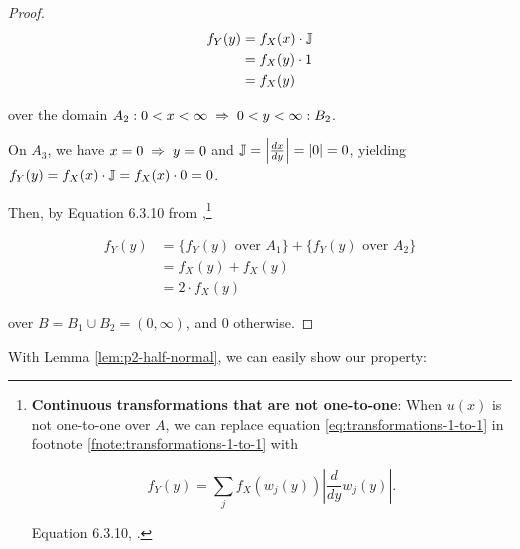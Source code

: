 \documentclass{article}
\begin{document}
\begin{proof}
  \begin{align*}
    f_Y(y) &= f_X(x) \cdot \mathbb{J} \\
    &= f_X(y) \cdot 1 \\
    &= f_X(y)
  \end{align*}

  over the domain $A_2: 0 < x < \infty \;\Rightarrow\; 0 < y < \infty :B_2$.

  On $A_3$, we have $x = 0 \;\Rightarrow\; y = 0$ and $\mathbb{J} = \left| \frac{dx}{dy} \right| =
  |0| = 0$, yielding $f_Y(y) = f_X(x) \cdot \mathbb{J} = f_X(x) \cdot 0 = 0$.

  Then, by Equation 6.3.10 from \citet{textbook},\footnote{\textbf{Continuous
  transformations that are not one-to-one}: When $u(x)$ is not one-to-one over
  $A$, we can replace equation \eqref{eq:transformations-1-to-1} in footnote
  \ref{fnote:transformations-1-to-1} with 

  \begin{equation*}
    f_Y(y) = \sum_j f_X(w_j(y)) \left| \frac{d}{dy} w_j(y) \right|.
  \end{equation*}

  Equation 6.3.10, \citet{textbook}.
  }

  \begin{align*}
    f_Y(y) &= \{ f_Y(y) \textrm{ over } A_1 \} + \{ f_Y(y) \textrm{ over } A_2 \} \\
    &= f_X(y) + f_X(y) \\
    &= 2 \cdot f_X(y)
  \end{align*}

  over $B = B_1 \cup B_2 = (0, \infty)$, and 0 otherwise.
\end{proof}

With Lemma \ref{lem:p2-half-normal}, we can easily show our property:
\end{document}
